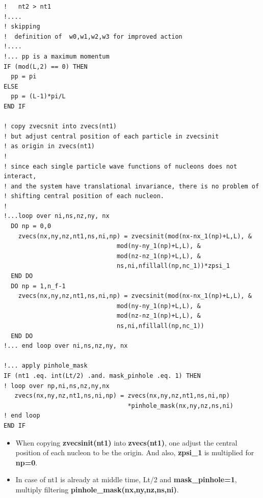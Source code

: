 \documentclass[10pt]{book}
\begin{document}
\begin{lstlisting}[frame=single]
!   nt2 > nt1
!....
! skipping 
!  definition of  w0,w1,w2,w3 for improved action 
!.... 
!... pp is a maximum momentum 
IF (mod(L,2) == 0) THEN
  pp = pi
ELSE
  pp = (L-1)*pi/L
END IF

! copy zvecsnit into zvecs(nt1)
! but adjust central position of each particle in zvecsinit 
! as origin in zvecs(nt1)
!
! since each single particle wave functions of nucleons does not interact,
! and the system have translational invariance, there is no problem of 
! shifting central position of each nucleon.  
! 
!...loop over ni,ns,nz,ny, nx 
  DO np = 0,0
    zvecs(nx,ny,nz,nt1,ns,ni,np) = zvecsinit(mod(nx-nx_1(np)+L,L), &
                               mod(ny-ny_1(np)+L,L), &
                               mod(nz-nz_1(np)+L,L), &
                               ns,ni,nfillall(np,nc_1))*zpsi_1           
  END DO
  DO np = 1,n_f-1
    zvecs(nx,ny,nz,nt1,ns,ni,np) = zvecsinit(mod(nx-nx_1(np)+L,L), &
                               mod(ny-ny_1(np)+L,L), &
                               mod(nz-nz_1(np)+L,L), &
                               ns,ni,nfillall(np,nc_1))
  END DO
!... end loop over ni,ns,nz,ny, nx 

!... apply pinhole_mask 
IF (nt1 .eq. int(Lt/2) .and. mask_pinhole .eq. 1) THEN
! loop over np,ni,ns,nz,ny,nx 
   zvecs(nx,ny,nz,nt1,ns,ni,np) = zvecs(nx,ny,nz,nt1,ns,ni,np)
                                  *pinhole_mask(nx,ny,nz,ns,ni)      
! end loop 
END IF

\end{lstlisting}
\begin{itemize}
	\item When copying {\bf zvecsinit(nt1)} into {\bf zvecs(nt1)}, one adjust the 
	      central position of each nucleon to be the origin. 
	      And also, {\bf zpsi\_1} is multiplied for {\bf np=0}.
	\item In case of nt1 is already at middle time, Lt/2 and {\bf mask\_pinhole=1},
	      multiply filtering {\bf pinhole\_mask(nx,ny,nz,ns,ni)}.          
\end{itemize} 
\end{document}
